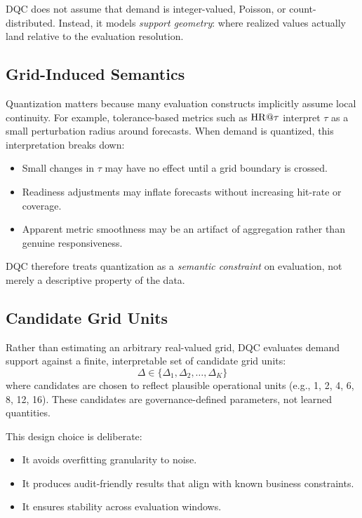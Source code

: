 DQC does not assume that demand is integer-valued, Poisson, or count-distributed.
Instead, it models \emph{support geometry}: where realized values actually land
relative to the evaluation resolution.

\subsection{Grid-Induced Semantics}

Quantization matters because many evaluation constructs implicitly assume local
continuity. For example, tolerance-based metrics such as $\mathrm{HR}@\tau$ interpret
$\tau$ as a small perturbation radius around forecasts. When demand is quantized,
this interpretation breaks down:

\begin{itemize}
  \item Small changes in $\tau$ may have no effect until a grid boundary is
  crossed.
  \item Readiness adjustments may inflate forecasts without increasing hit-rate
  or coverage.
  \item Apparent metric smoothness may be an artifact of aggregation rather than
  genuine responsiveness.
\end{itemize}

DQC therefore treats quantization as a \emph{semantic constraint} on evaluation,
not merely a descriptive property of the data.

\subsection{Candidate Grid Units}

Rather than estimating an arbitrary real-valued grid, DQC evaluates demand
support against a finite, interpretable set of candidate grid units:
\[
  \Delta \in \{\Delta_1, \Delta_2, \dots, \Delta_K\}
\]
where candidates are chosen to reflect plausible operational units (e.g.,
1, 2, 4, 6, 8, 12, 16). These candidates are governance-defined parameters,
not learned quantities.

This design choice is deliberate:

\begin{itemize}
  \item It avoids overfitting granularity to noise.
  \item It produces audit-friendly results that align with known business
  constraints.
  \item It ensures stability across evaluation windows.
\end{itemize}

